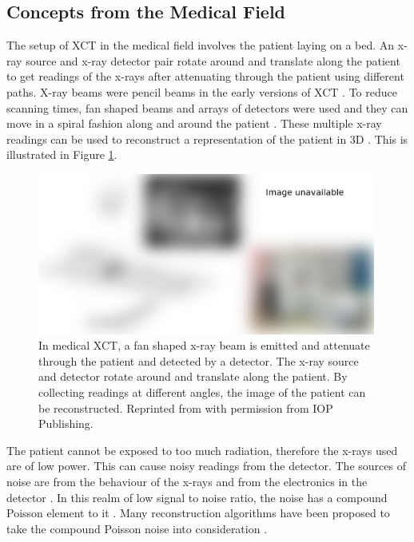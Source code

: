 \subsection{Concepts from the Medical Field}

The setup of XCT \citep{cormack1973reconstruction, hounsfield1973computerized, hounsfield1980computed} in the medical field involves the patient laying on a bed. An x-ray source and x-ray detector pair rotate around and translate along the patient to get readings of the x-rays after attenuating through the patient using different paths. X-ray beams were pencil beams in the early versions of XCT \citep{michael2001x}. To reduce scanning times, fan shaped beams and arrays of detectors were used and they can move in a spiral fashion along and around the patient \citep{cierniak2011x}. These multiple x-ray readings can be used to reconstruct a representation of the patient in 3D \citep{zeng2010medical}. This is illustrated in Figure \ref{fig:literature_medicalct}.

\begin{figure}
  \centering
  \includegraphics[width=0.99\textwidth]{../figures/literatureReview/literature_medicalct.png}
  \caption{In medical XCT, a fan shaped x-ray beam is emitted and attenuate through the patient and detected by a detector. The x-ray source and detector rotate around and translate along the patient. By collecting readings at different angles, the image of the patient can be reconstructed. Reprinted from \cite{michael2001x} with permission from IOP Publishing.}
  \label{fig:literature_medicalct}
\end{figure}

The patient cannot be exposed to too much radiation, therefore the x-rays used are of low power. This can cause noisy readings from the detector. The sources of noise are from the behaviour of the x-rays and from the electronics in the detector \citep{yang2010noise}. In this realm of low signal to noise ratio, the noise has a compound Poisson element to it \citep{whiting2002signal, whiting2006properties}. Many reconstruction algorithms have been proposed to take the compound Poisson noise into consideration \citep{elbakri2002statistical, elbakri2003efficient, elbakri2003statistical, lasio2007statistical, xie2008x}.

